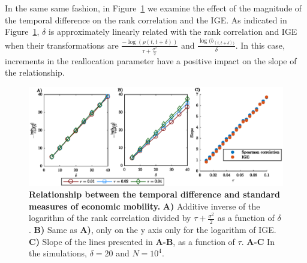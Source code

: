 \documentclass[11pt]{article}
\newcommand{\Fref}[1]{Figure~\ref{fig:#1}}
\numberwithin{equation}{section}
\begin{document}
In the same same fashion, in \Fref{rgbm-standard-measures-delta} we examine the effect of the magnitude of the temporal difference on the rank correlation and the IGE. As indicated in \Fref{rgbm-standard-measures-delta}, $\delta$ is approximately linearly related with the rank correlation and IGE when their transformations are $\frac{-\log(\rho(t,t+\delta))}{\tau + \frac{\sigma^2}{2}}$ and $\frac{\log(b_{(t,t+\delta))}}{\delta}$. In this case, increments in the reallocation parameter have a positive impact on the slope of the relationship.

\begin{figure}[!htb]
\centering
\includegraphics[width=1.0\textwidth]{figs/fig_rgbm_delta_relationship.eps}
\caption{\textbf{Relationship between the temporal difference and standard measures of economic mobility.} \textbf{A)} Additive inverse of the logarithm of the rank correlation divided by $\tau +\frac{\sigma^2}{2}$ as a function of $\delta$. \textbf{B)} Same as \textbf{A)}, only on the y axis only for the logarithm of IGE. \textbf{C)} Slope of the lines presented in \textbf{A-B}, as a function of $\tau$. 
\textbf{A-C} In the simulations, $\delta = 20$ and $N = 10^4$.
\label{fig:rgbm-standard-measures-delta}}
\end{figure}
\FloatBarrier
\end{document}
